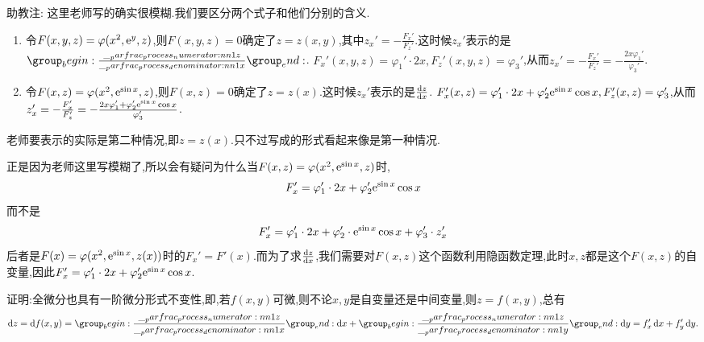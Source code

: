 \begin{solution}
    \begin{remark}
        助教注: 这里老师写的确实很模糊.我们要区分两个式子和他们分别的含义.
        \begin{enumerate}
            \item 令$F(x,y,z) = \varphi(x^2, \mathrm{e}^y, z)$,则$F(x,y,z) = 0$确定了$z = z(x,y)$,其中$z_x' = - \frac{F_x'}{F_z'}$.这时候$z_x'$表示的是$\parfrac{z}{x}$.
            $F_x'(x,y,z) = \varphi_1' \cdot 2x, F_z'(x,y,z) = \varphi_3'$,从而$z_x' = - \frac{F_x'}{F_z'} = - \frac{2x \varphi_1'}{\varphi_3'}$.
            \item 令$F(x,z) = \varphi(x^2, \mathrm{e}^{\sin x}, z)$,则$F(x,z) = 0$确定了$z = z(x)$.这时候$z_x'$表示的是$\frac{\operatorname{d\!} z}{\operatorname{d\!} x}$.
            $F_x'(x,z) = \varphi_1' \cdot 2x + \varphi_2' \mathrm{e}^{\sin x} \cos x, F_z'(x,z) = \varphi_3'$,从而$z_x' = - \frac{F_x'}{F_z'} = - \frac{2x \varphi_1' + \varphi_2' \mathrm{e}^{\sin x} \cos x}{\varphi_3'}$.
        \end{enumerate}
        老师要表示的实际是第二种情况,即$z = z(x)$.只不过写成的形式看起来像是第一种情况.
    \end{remark}
    \begin{remark}
        正是因为老师这里写模糊了,所以会有疑问为什么当$F(x,z) = \varphi(x^2, \mathrm{e}^{\sin x}, z)$时, $$F_x' = \varphi_1' \cdot 2x + \varphi_2' \mathrm{e}^{\sin x} \cos x$$而不是$$F_x' = \varphi_1' \cdot 2x + \varphi_2' \cdot \mathrm{e}^{\sin x} \cos x+\varphi_3' \cdot z_x'$$
        后者是$F(x) = \varphi(x^2, \mathrm{e}^{\sin x}, z(x))$时的$F_x' = F'(x)$.而为了求$\frac{\operatorname{d\!} z}{\operatorname{d\!} x}$,我们需要对$F(x,z)$这个函数利用隐函数定理,此时$x,z$都是这个$F(x,z)$的自变量,因此$F_x'=\varphi_1' \cdot 2x + \varphi_2' \mathrm{e}^{\sin x} \cos x$.
    \end{remark}
\end{solution}

\begin{example}
    证明:全微分也具有一阶微分形式不变性,即,若$f(x,y)$可微,则不论$x,y$是自变量还是中间变量,则$z = f(x,y)$,总有
    $$ \dif z= \dif f(x,y) = \parfrac{z}{x} \dif x + \parfrac{z}{y} \dif y = f_x' \dif x + f_y' \dif y. $$
\end{example}

